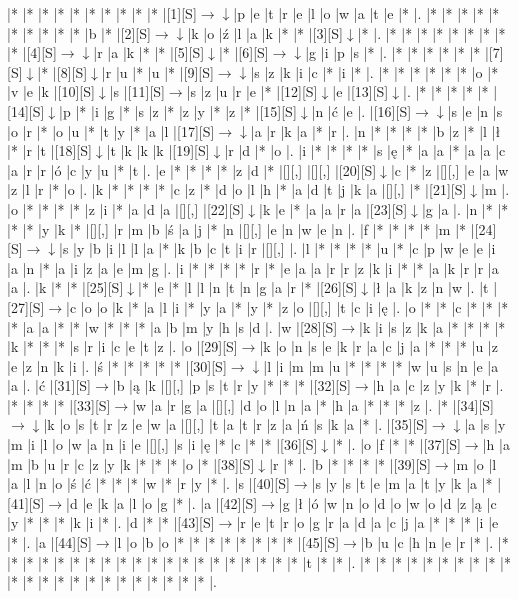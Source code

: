 \documentclass[11pt]{article}
\newcommand\drarr{$\rightarrow \!\!\!\!\! \downarrow$}
\newcommand\rarr{$\rightarrow$}
\newcommand\darr{$\downarrow$}
\begin{document}
\noindent\begin{Puzzle}{22}{33}|*	|*	|*	|*	|*	|*	|*	|*	|*	|*	|[1][S]\drarr	|p	|e	|t	|r	|e	|l	|o	|w	|a	|t	|e	|*	|.
|*	|*	|*	|*	|*	|*	|*	|*	|*	|*	|b	|*	|[2][S]\drarr	|k	|o	|ź	|l	|a	|k	|*	|*	|[3][S]\darr	|*	|.
|*	|*	|*	|*	|*	|*	|*	|*	|*	|[4][S]\drarr	|r	|a	|k	|*	|*	|[5][S]\darr	|*	|[6][S]\drarr	|g	|i	|p	|s	|*	|.
|*	|*	|*	|*	|*	|*	|[7][S]\darr	|*	|[8][S]\darr	|r	|u	|*	|u	|*	|[9][S]\drarr	|s	|z	|k	|i	|c	|*	|i	|*	|.
|*	|*	|*	|*	|*	|*	|o	|*	|v	|e	|k	|[10][S]\darr	|s	|[11][S]\rarr	|s	|z	|u	|r	|e	|*	|[12][S]\darr	|e	|[13][S]\darr	|.
|*	|*	|*	|*	|*	|[14][S]\darr	|p	|*	|i	|g	|*	|s	|z	|*	|z	|y	|*	|z	|*	|[15][S]\darr	|n	|ć	|e	|.
|[16][S]\drarr	|s	|e	|n	|s	|o	|r	|*	|o	|u	|*	|t	|y	|*	|a	|l	|[17][S]\drarr	|a	|r	|k	|a	|*	|r	|.
|n	|*	|*	|*	|*	|b	|z	|*	|l	|ł	|*	|r	|t	|[18][S]\darr	|t	|k	|k	|k	|[19][S]\darr	|r	|d	|*	|o	|.
|i	|*	|*	|*	|*	|s	|ę	|*	|a	|a	|*	|a	|a	|c	|a	|r	|r	|ó	|c	|y	|u	|*	|t	|.
|e	|*	|*	|*	|*	|z	|d	|*	|[][,]{ }	|[][,]{ }	|[20][S]\darr	|c	|*	|z	|[][,]{ }	|e	|a	|w	|z	|l	|r	|*	|o	|.
|k	|*	|*	|*	|*	|c	|z	|*	|d	|o	|l	|h	|*	|a	|d	|t	|j	|k	|a	|[][,]{ }	|*	|[21][S]\darr	|m	|.
|o	|*	|*	|*	|*	|z	|i	|*	|a	|d	|a	|[][,]{ }	|[22][S]\darr	|k	|e	|*	|a	|a	|r	|a	|[23][S]\darr	|g	|a	|.
|n	|*	|*	|*	|*	|y	|k	|*	|[][,]{ }	|r	|m	|b	|ś	|a	|j	|*	|n	|[][,]{ }	|e	|n	|w	|e	|n	|.
|f	|*	|*	|*	|*	|m	|*	|[24][S]\drarr	|s	|y	|b	|i	|l	|l	|a	|*	|k	|b	|c	|t	|i	|r	|[][,]{ }	|.
|l	|*	|*	|*	|*	|u	|*	|c	|p	|w	|e	|e	|i	|a	|n	|*	|a	|i	|z	|a	|e	|m	|g	|.
|i	|*	|*	|*	|*	|r	|*	|e	|a	|a	|r	|r	|z	|k	|i	|*	|*	|a	|k	|r	|r	|a	|a	|.
|k	|*	|*	|[25][S]\darr	|*	|e	|*	|l	|l	|n	|t	|n	|g	|a	|r	|*	|[26][S]\darr	|ł	|a	|k	|z	|n	|w	|.
|t	|[27][S]\rarr	|c	|o	|o	|k	|*	|a	|l	|i	|*	|y	|a	|*	|y	|*	|z	|o	|[][,]{ }	|t	|c	|i	|ę	|.
|o	|*	|*	|c	|*	|*	|*	|*	|a	|a	|*	|*	|w	|*	|*	|*	|a	|b	|m	|y	|h	|s	|d	|.
|w	|[28][S]\rarr	|k	|i	|s	|z	|k	|a	|*	|*	|*	|*	|k	|*	|*	|*	|s	|r	|i	|c	|e	|t	|z	|.
|o	|[29][S]\rarr	|k	|o	|n	|s	|e	|k	|r	|a	|c	|j	|a	|*	|*	|*	|u	|z	|e	|z	|n	|k	|i	|.
|ś	|*	|*	|*	|*	|*	|[30][S]\drarr	|l	|i	|m	|m	|u	|*	|*	|*	|*	|w	|u	|s	|n	|e	|a	|a	|.
|ć	|[31][S]\rarr	|b	|ą	|k	|[][,]{ }	|p	|s	|t	|r	|y	|*	|*	|*	|[32][S]\rarr	|h	|a	|c	|z	|y	|k	|*	|r	|.
|*	|*	|*	|*	|[33][S]\rarr	|w	|a	|r	|g	|a	|[][,]{ }	|d	|o	|l	|n	|a	|*	|h	|a	|*	|*	|*	|z	|.
|*	|[34][S]\drarr	|k	|o	|s	|t	|r	|z	|e	|w	|a	|[][,]{ }	|t	|a	|t	|r	|z	|a	|ń	|s	|k	|a	|*	|.
|[35][S]\drarr	|a	|s	|y	|m	|i	|l	|o	|w	|a	|n	|i	|e	|[][,]{ }	|s	|i	|ę	|*	|c	|*	|*	|[36][S]\darr	|*	|.
|o	|f	|*	|*	|[37][S]\rarr	|h	|a	|m	|b	|u	|r	|c	|z	|y	|k	|*	|*	|*	|o	|*	|[38][S]\darr	|r	|*	|.
|b	|*	|*	|*	|*	|[39][S]\rarr	|m	|o	|l	|a	|l	|n	|o	|ś	|ć	|*	|*	|*	|w	|*	|r	|y	|*	|.
|s	|[40][S]\rarr	|s	|y	|s	|t	|e	|m	|a	|t	|y	|k	|a	|*	|[41][S]\rarr	|d	|e	|k	|a	|l	|o	|g	|*	|.
|a	|[42][S]\rarr	|g	|ł	|ó	|w	|n	|o	|d	|o	|w	|o	|d	|z	|ą	|c	|y	|*	|*	|*	|k	|i	|*	|.
|d	|*	|*	|[43][S]\rarr	|r	|e	|t	|r	|o	|g	|r	|a	|d	|a	|c	|j	|a	|*	|*	|*	|i	|e	|*	|.
|a	|[44][S]\rarr	|l	|o	|b	|o	|*	|*	|*	|*	|*	|*	|*	|*	|[45][S]\rarr	|b	|u	|c	|h	|n	|e	|r	|*	|.
|*	|*	|*	|*	|*	|*	|*	|*	|*	|*	|*	|*	|*	|*	|*	|*	|*	|*	|*	|*	|t	|*	|*	|.
|*	|*	|*	|*	|*	|*	|*	|*	|*	|*	|*	|*	|*	|*	|*	|*	|*	|*	|*	|*	|*	|*	|*	|.\end{Puzzle}
\end{document}
